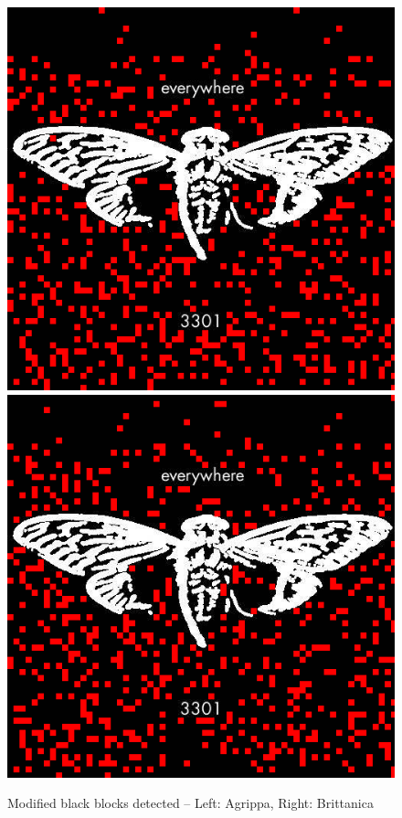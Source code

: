 \documentclass{article}
\begin{document}
\begin{figure}[h]
	\centering
	\includegraphics[scale=0.3]{agrippa_black_modifications_detected}
	\includegraphics[scale=0.3]{brittanica_black_modifications_detected}
	
	\caption{Modified black blocks detected -- Left: Agrippa, Right: Brittanica}
\end{figure}
\end{document}
